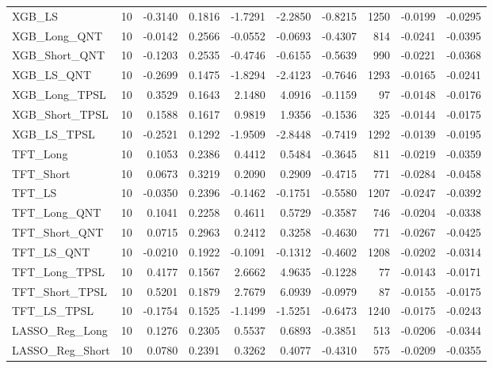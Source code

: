 \begin{tabular}{llrrrrrrrr}
\cline{1-10}
XGB\_LS & 10 & -0.3140 & 0.1816 & -1.7291 & -2.2850 & -0.8215 & 1250 & -0.0199 & -0.0295 \\
\cline{1-10}
XGB\_Long\_QNT & 10 & -0.0142 & 0.2566 & -0.0552 & -0.0693 & -0.4307 & 814 & -0.0241 & -0.0395 \\
\cline{1-10}
XGB\_Short\_QNT & 10 & -0.1203 & 0.2535 & -0.4746 & -0.6155 & -0.5639 & 990 & -0.0221 & -0.0368 \\
\cline{1-10}
XGB\_LS\_QNT & 10 & -0.2699 & 0.1475 & -1.8294 & -2.4123 & -0.7646 & 1293 & -0.0165 & -0.0241 \\
\cline{1-10}
XGB\_Long\_TPSL & 10 & 0.3529 & 0.1643 & 2.1480 & 4.0916 & -0.1159 & 97 & -0.0148 & -0.0176 \\
\cline{1-10}
XGB\_Short\_TPSL & 10 & 0.1588 & 0.1617 & 0.9819 & 1.9356 & -0.1536 & 325 & -0.0144 & -0.0175 \\
\cline{1-10}
XGB\_LS\_TPSL & 10 & -0.2521 & 0.1292 & -1.9509 & -2.8448 & -0.7419 & 1292 & -0.0139 & -0.0195 \\
\cline{1-10}
TFT\_Long & 10 & 0.1053 & 0.2386 & 0.4412 & 0.5484 & -0.3645 & 811 & -0.0219 & -0.0359 \\
\cline{1-10}
TFT\_Short & 10 & 0.0673 & 0.3219 & 0.2090 & 0.2909 & -0.4715 & 771 & -0.0284 & -0.0458 \\
\cline{1-10}
TFT\_LS & 10 & -0.0350 & 0.2396 & -0.1462 & -0.1751 & -0.5580 & 1207 & -0.0247 & -0.0392 \\
\cline{1-10}
TFT\_Long\_QNT & 10 & 0.1041 & 0.2258 & 0.4611 & 0.5729 & -0.3587 & 746 & -0.0204 & -0.0338 \\
\cline{1-10}
TFT\_Short\_QNT & 10 & 0.0715 & 0.2963 & 0.2412 & 0.3258 & -0.4630 & 771 & -0.0267 & -0.0425 \\
\cline{1-10}
TFT\_LS\_QNT & 10 & -0.0210 & 0.1922 & -0.1091 & -0.1312 & -0.4602 & 1208 & -0.0202 & -0.0314 \\
\cline{1-10}
TFT\_Long\_TPSL & 10 & 0.4177 & 0.1567 & 2.6662 & 4.9635 & -0.1228 & 77 & -0.0143 & -0.0171 \\
\cline{1-10}
TFT\_Short\_TPSL & 10 & 0.5201 & 0.1879 & 2.7679 & 6.0939 & -0.0979 & 87 & -0.0155 & -0.0175 \\
\cline{1-10}
TFT\_LS\_TPSL & 10 & -0.1754 & 0.1525 & -1.1499 & -1.5251 & -0.6473 & 1240 & -0.0175 & -0.0243 \\
\cline{1-10}
LASSO\_Reg\_Long & 10 & 0.1276 & 0.2305 & 0.5537 & 0.6893 & -0.3851 & 513 & -0.0206 & -0.0344 \\
\cline{1-10}
LASSO\_Reg\_Short & 10 & 0.0780 & 0.2391 & 0.3262 & 0.4077 & -0.4310 & 575 & -0.0209 & -0.0355 \\

\end{tabular}
